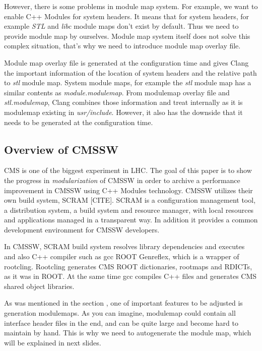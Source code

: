 \documentclass[12pt]{iopart}
\begin{document}
However, there is some problems in module map system.  For example, we want to enable C++ Modules for system headers. It means that for system headers, for example \textit{STL} and \textit{libc} module maps don’t exist by default. Thus we need to provide module map by ourselves. Module map system itself does not solve this complex situation, that’s why we need to introduce module map overlay file.

Module map overlay file is generated at the configuration time and gives Clang the important information of the location of system headers and the relative path to \textit{stl} module map. System module maps, for example the \textit{stl} module map has a similar contents as \textit{module.modulemap}. From modulemap overlay file and \textit{stl.modulemap}, Clang combines those information and treat internally as it is modulemap existing in \textit{usr/include}. However, it also has the downside that it needs to be generated at the configuration time.

\subsection{Overview of CMSSW}
\label{cmssw}

CMS \cite{cms} is one of the biggest experiment in LHC. The goal of this paper is to show the progress in \textit{modularization} of CMSSW in order to archive a performance improvement in CMSSW using C++ Modules technology. CMSSW utilizes their own build system, SCRAM [CITE]. SCRAM is a configuration management tool, a distribution system, a build system and resource manager, with local resources and applications managed in a transparent way. In addition it provides a common development environment for CMSSW developers.

In CMSSW, SCRAM build system resolves library dependencies and executes and also C++ compiler such as gcc ROOT Genreflex, which is a wrapper of rootcling.
Rootcling generates CMS ROOT dictionaries, rootmaps and RDICTs, as it was in ROOT. At the same time gcc compiles C++ files and generates CMS shared object libraries. 

As was mentioned in the section \cite{intro}, one of important features to be adjusted is generation modulemaps. As you can imagine, modulemap could contain all interface header files in the end, and can be quite large and become hard to maintain by hand. This is why we need to autogenerate the module map, which will be explained in next slides.
\end{document}
